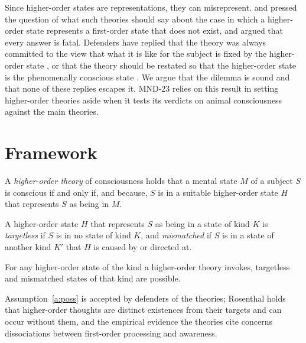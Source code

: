 \documentclass{situationist-preprint}
\begin{document}
Since higher-order states are representations, they can misrepresent. \citet{Byrne1997} and \citet{Neander1998} pressed the question of what such theories should say about the case in which a higher-order state represents a first-order state that does not exist, and \citet{Block2011} argued that every answer is fatal. Defenders have replied that the theory was always committed to the view that what it is like for the subject is fixed by the higher-order state \citep{Rosenthal2011,Weisberg2011}, or that the theory should be restated so that the higher-order state is the phenomenally conscious state \citep{Brown2015}. We argue that the dilemma is sound and that none of these replies escapes it. MND-23 relies on this result in setting higher-order theories aside when it tests its verdicts on animal consciousness against the main theories.

\section{Framework}

\begin{definition}\label{d:ho}
A \emph{higher-order theory} of consciousness holds that a mental state $M$ of a subject $S$ is conscious if and only if, and because, $S$ is in a suitable higher-order state $H$ that represents $S$ as being in $M$.
\end{definition}

\begin{definition}[Misrepresentation]\label{d:mis}
A higher-order state $H$ that represents $S$ as being in a state of kind $K$ is \emph{targetless} if $S$ is in no state of kind $K$, and \emph{mismatched} if $S$ is in a state of another kind $K'$ that $H$ is caused by or directed at.
\end{definition}

\begin{assumption}\label{a:poss}
For any higher-order state of the kind a higher-order theory invokes, targetless and mismatched states of that kind are possible.
\end{assumption}

Assumption~\ref{a:poss} is accepted by defenders of the theories; Rosenthal holds that higher-order thoughts are distinct existences from their targets and can occur without them, and the empirical evidence the theories cite concerns dissociations between first-order processing and awareness.
\end{document}
